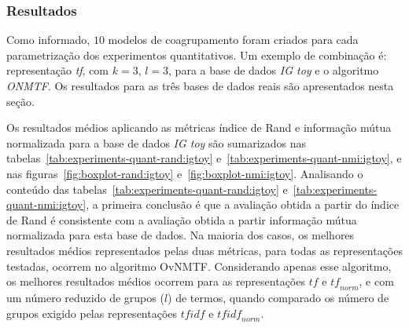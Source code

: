 \documentclass[
    12pt,                %
    oneside,            %
    a4paper,            %
    english,            %
    brazil                %
    ]{abntex2ppgsi}
\begin{document}
\subsubsection{Resultados}
\label{subsec:experiments-quant:results}

Como informado, $10$ modelos de coagrupamento foram criados para cada parametrização dos experimentos quantitativos. Um exemplo de combinação é: representação \textit{tf}, com $k = 3$, $l = 3$, para a base de dados \textit{IG toy} e o algoritmo \textit{ONMTF}. Os resultados para as três bases de dados reais são apresentados nesta seção.


Os resultados médios aplicando as métricas índice de Rand e informação mútua normalizada para a base de dados \textit{IG toy} são sumarizados nas tabelas~\ref{tab:experiments-quant-rand:igtoy} e~\ref{tab:experiments-quant-nmi:igtoy}, e nas figuras~\ref{fig:boxplot-rand:igtoy} e~\ref{fig:boxplot-nmi:igtoy}.
Analisando o conteúdo das tabelas~\ref{tab:experiments-quant-rand:igtoy} e~\ref{tab:experiments-quant-nmi:igtoy}, a primeira conclusão é que a avaliação obtida a partir do índice de Rand é consistente com a avaliação obtida a partir informação mútua normalizada para esta base de dados. Na maioria dos casos, os melhores resultados médios representados pelas duas métricas, para todas as representações testadas, ocorrem no algoritmo OvNMTF. Considerando apenas esse algoritmo, os melhores resultados médios ocorrem para as representações $\textit{tf}$ e $\textit{tf}_{norm}$, e com um número reduzido de grupos ($l$) de termos, quando comparado os número de grupos exigido pelas representações $\textit{tfidf}$ e $\textit{tfidf}_{norm}$.
\end{document}

